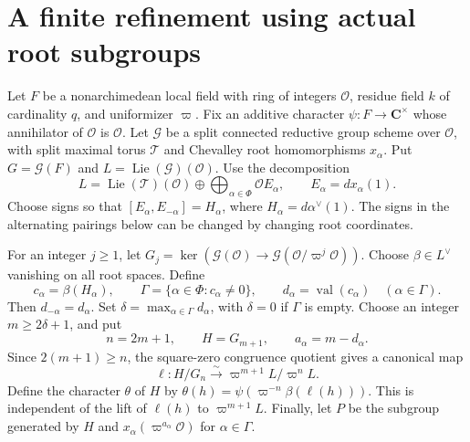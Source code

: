 \documentclass[10pt]{amsart}
\newcommand{\Ocal}{\mathcal O}
\newcommand{\Gcal}{\mathcal G}
\newcommand{\C}{\mathbf C}
\newcommand{\val}{\operatorname{val}}
\begin{document}
\section{A finite refinement using actual root subgroups}

Let $F$ be a nonarchimedean local field with ring of integers $\Ocal$, residue field
$k$ of cardinality $q$, and uniformizer $\varpi$. Fix an additive character
$\psi:F\to\C^\times$ whose annihilator of $\Ocal$ is $\Ocal$.
Let $\Gcal$ be a split connected reductive group scheme over $\Ocal$, with split
maximal torus $\mathcal T$ and Chevalley root homomorphisms $x_\alpha$.
Put $G=\Gcal(F)$ and $L=\operatorname{Lie}(\Gcal)(\Ocal)$. Use the decomposition
\[
 L=\operatorname{Lie}(\mathcal T)(\Ocal)
       \oplus\bigoplus_{\alpha\in\Phi}\Ocal E_\alpha,
 \qquad E_\alpha=dx_\alpha(1).
\]
Choose signs so that $[E_\alpha,E_{-\alpha}]=H_\alpha$, where
$H_\alpha=d\alpha^\vee(1)$. The signs in the alternating pairings below can be
changed by changing root coordinates.

For an integer $j\geq1$, let
$G_j=\ker(\Gcal(\Ocal)\to\Gcal(\Ocal/\varpi^j\Ocal))$.
Choose $\beta\in L^\vee$ vanishing on all root spaces. Define
\[
 c_\alpha=\beta(H_\alpha),\qquad
 \Gamma=\{\alpha\in\Phi:c_\alpha\ne0\},\qquad
 d_\alpha=\val(c_\alpha)\quad(\alpha\in\Gamma).
\]
Then $d_{-\alpha}=d_\alpha$. Set $\delta=\max_{\alpha\in\Gamma}d_\alpha$,
with $\delta=0$ if $\Gamma$ is empty. Choose an integer $m\geq2\delta+1$, and put
\[
 n=2m+1,\qquad H=G_{m+1},\qquad a_\alpha=m-d_\alpha.
\]
Since $2(m+1)\geq n$, the square-zero congruence quotient gives a canonical map
\[
 \ell:H/G_n\xrightarrow{\sim}
       \varpi^{m+1}L/\varpi^nL.
\]
Define the character $\theta$ of $H$ by
$\theta(h)=\psi(\varpi^{-n}\beta(\ell(h)))$. This is independent of the lift of
$\ell(h)$ to $\varpi^{m+1}L$.
Finally, let $P$ be the subgroup generated by $H$ and
$x_\alpha(\varpi^{a_\alpha}\Ocal)$ for $\alpha\in\Gamma$.
\end{document}
